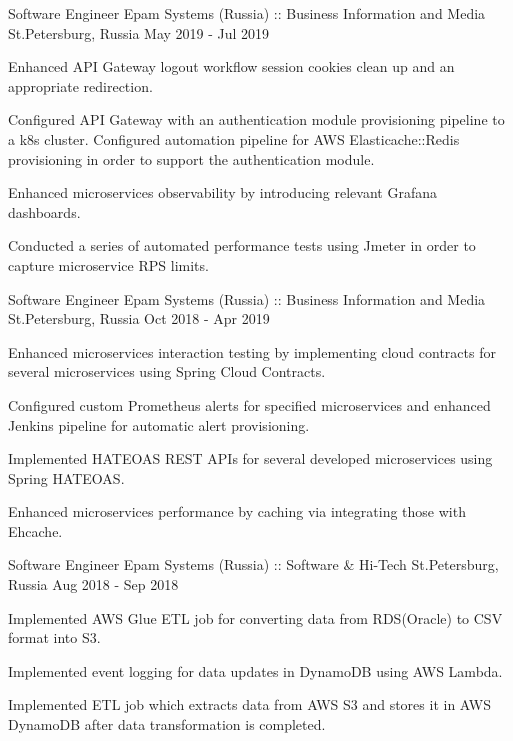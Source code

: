 \begin{cventries}
\cventry
{Software Engineer} %
{Epam Systems (Russia) :: Business Information and Media} %
{St.Petersburg, Russia} %
{May 2019 - Jul 2019} %
{
  \begin{cvitems} %
    \item {Enhanced API Gateway logout workflow session cookies clean up and an appropriate redirection.}
    \item {Configured API Gateway with an authentication module provisioning pipeline to a k8s cluster. 
    Configured automation pipeline for AWS Elasticache::Redis provisioning in order to support the authentication module.}
    \item {Enhanced microservices observability by introducing relevant Grafana dashboards.}
    \item {Conducted a series of automated performance tests using Jmeter in order to capture microservice RPS limits.}
  \end{cvitems}
}

\cventry
{Software Engineer} %
{Epam Systems (Russia) :: Business Information and Media} %
{St.Petersburg, Russia} %
{Oct 2018 - Apr 2019} %
{
  \begin{cvitems} %
    \item { Enhanced microservices interaction testing by implementing cloud contracts for several microservices using Spring Cloud Contracts.}
    \item {Configured custom Prometheus alerts for specified microservices and enhanced Jenkins pipeline for automatic alert provisioning.}
    \item {Implemented HATEOAS  REST APIs for several developed microservices using Spring HATEOAS.}
    \item {Enhanced microservices performance by caching via integrating those with Ehcache.}
  \end{cvitems}
}

\cventry
{Software Engineer} %
{Epam Systems (Russia) :: Software \& Hi-Tech} %
{St.Petersburg, Russia} %
{Aug 2018 - Sep 2018} %
{
  \begin{cvitems} %
    \item {Implemented AWS Glue ETL job for converting data from RDS(Oracle) to CSV format into S3.}
    \item {Implemented event logging for data updates in DynamoDB using AWS Lambda.}
    \item {Implemented ETL job which extracts data from AWS S3 and stores it in AWS DynamoDB after data transformation is completed.}
  \end{cvitems}
}


\end{cventries}
